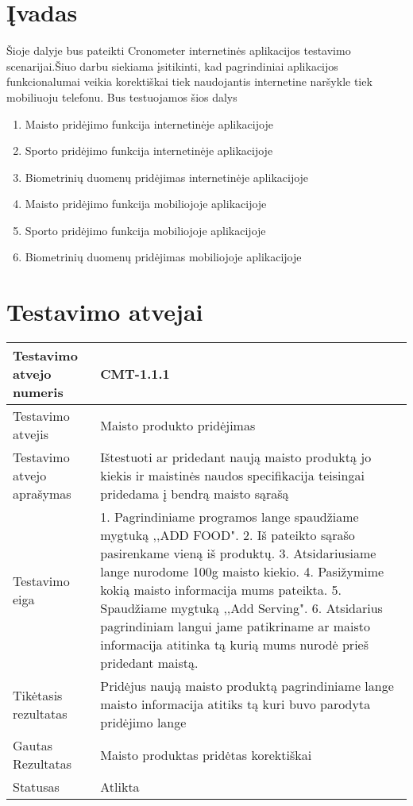 \documentclass[oneside]{VUMIFPSkursinis}
\begin{document}
\section{Įvadas}
Šioje dalyje bus pateikti Cronometer internetinės aplikacijos testavimo scenarijai.Šiuo darbu siekiama įsitikinti, kad pagrindiniai aplikacijos funkcionalumai veikia korektiškai tiek naudojantis internetine naršykle tiek mobiliuoju telefonu. Bus testuojamos šios dalys
	\begin{enumerate}
		\item{Maisto pridėjimo funkcija internetinėje aplikacijoje}
		\item{Sporto pridėjimo funkcija internetinėje aplikacijoje}
		\item{Biometrinių duomenų pridėjimas internetinėje aplikacijoje}
		\item{Maisto pridėjimo funkcija mobiliojoje aplikacijoje}
		\item{Sporto pridėjimo funkcija mobiliojoje aplikacijoje}
		\item{Biometrinių duomenų pridėjimas mobiliojoje aplikacijoje}
	\end{enumerate}

\section{Testavimo atvejai}
\begin{center}
    \begin{tabular}{ |p{5cm}|p{13cm}|}
    \hline
    	Testavimo atvejo numeris & CMT-1.1.1\\ \hline
    	Testavimo atvejis & Maisto produkto pridėjimas \\ \hline
	Testavimo atvejo aprašymas & Ištestuoti ar pridedant naują maisto produktą jo kiekis ir maistinės naudos specifikacija teisingai pridedama į bendrą maisto sąrašą   \\ \hline
	Testavimo eiga &1. Pagrindiniame programos lange spaudžiame mygtuką ,,ADD FOOD". 
				2. Iš pateikto sąrašo pasirenkame vieną iš produktų. 
				3. Atsidariusiame lange nurodome 100g maisto kiekio.
				4. Pasižymime kokią maisto informacija mums pateikta. 
				5. Spaudžiame mygtuką ,,Add Serving".
				6. Atsidarius pagrindiniam langui jame patikriname ar maisto informacija atitinka tą kurią mums nurodė prieš pridedant maistą.\\ \hline
	Tikėtasis rezultatas &  Pridėjus naują maisto produktą pagrindiniame lange maisto informacija atitiks tą kuri buvo parodyta pridėjimo lange\\ \hline
	Gautas Rezultatas & Maisto produktas pridėtas korektiškai  \\ \hline
	Statusas &  Atlikta\\ \hline
    \hline
    \end{tabular}
\end{center}
\end{document}
